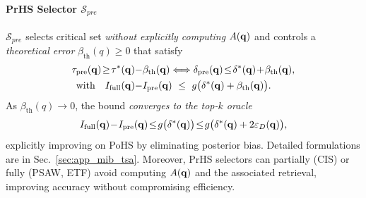 \paragraph{PrHS Selector $\mathcal S_{pre}$} $\mathcal S_{pre}$ selects critical set \emph{without explicitly computing} $A(\mathbf{q})$ and controls a \emph{theoretical error} $\beta_{\mathrm{th}}(q)\!\ge\!0$ that satisfy
\begin{equation}
\label{eq:prhs_bound}
\begin{aligned}
    \tau_{\mathrm{pre}}(\bq)\! \ge\! \tau^{*}(\bq)-&\beta_{\mathrm{th}}(\bq) \Longleftrightarrow \delta_{\mathrm{pre}}(\bq)\! \le\! \delta^{*}(\bq)\!+\!\beta_{\mathrm{th}}(\bq), \\
    \text{with} \quad I_{\mathrm{full}}(\bq)-&I_{\mathrm{pre}}(\bq)\ \le\ g\big(\delta^{*}(\bq)+\beta_{\mathrm{th}}(\bq)\big).
\end{aligned}
\end{equation}
As $\beta_{\mathrm{th}}(q)\!\to\!0$, the bound \emph{converges to the top-$k$ oracle}
\begin{equation}
\label{eq:limit_to_oracle}
I_{\mathrm{full}}(\mathbf{q})\!-\!I_{\mathrm{pre}}(\mathbf{q})
\!\le\!
g\big(\delta^{*}(\mathbf{q})\big)\!\le\!g\big(\delta^{*}(\mathbf{q})+2\varepsilon_{D}(\mathbf{q})\big),
\end{equation}
explicitly improving on PoHS by eliminating posterior bias. Detailed formulations are in Sec.~\ref{sec:app_mib_tsa}. Moreover, PrHS selectors can partially (CIS) or fully (PSAW, ETF) avoid computing $A(\mathbf{q})$ and the associated retrieval, improving accuracy without compromising efficiency.











